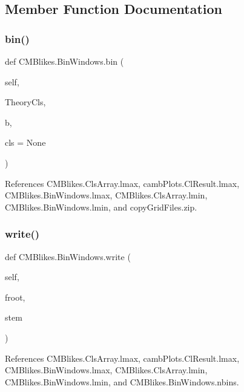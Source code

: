 \subsection{Member Function Documentation}
\mbox{\label{classCMBlikes_1_1BinWindows_aa6698e02e78f67659793b69ca9325331}} 
\subsubsection{\texorpdfstring{bin()}{bin()}}
{\footnotesize\ttfamily def C\+M\+Blikes.\+Bin\+Windows.\+bin (\begin{DoxyParamCaption}\item[{}]{self,  }\item[{}]{Theory\+Cls,  }\item[{}]{b,  }\item[{}]{cls = {\ttfamily None} }\end{DoxyParamCaption})}



References C\+M\+Blikes.\+Cls\+Array.\+lmax, camb\+Plots.\+Cl\+Result.\+lmax, C\+M\+Blikes.\+Bin\+Windows.\+lmax, C\+M\+Blikes.\+Cls\+Array.\+lmin, C\+M\+Blikes.\+Bin\+Windows.\+lmin, and copy\+Grid\+Files.\+zip.

\mbox{\label{classCMBlikes_1_1BinWindows_a447bc4a1d1f5e848e75a988a381ab81e}} 
\subsubsection{\texorpdfstring{write()}{write()}}
{\footnotesize\ttfamily def C\+M\+Blikes.\+Bin\+Windows.\+write (\begin{DoxyParamCaption}\item[{}]{self,  }\item[{}]{froot,  }\item[{}]{stem }\end{DoxyParamCaption})}



References C\+M\+Blikes.\+Cls\+Array.\+lmax, camb\+Plots.\+Cl\+Result.\+lmax, C\+M\+Blikes.\+Bin\+Windows.\+lmax, C\+M\+Blikes.\+Cls\+Array.\+lmin, C\+M\+Blikes.\+Bin\+Windows.\+lmin, and C\+M\+Blikes.\+Bin\+Windows.\+nbins.



